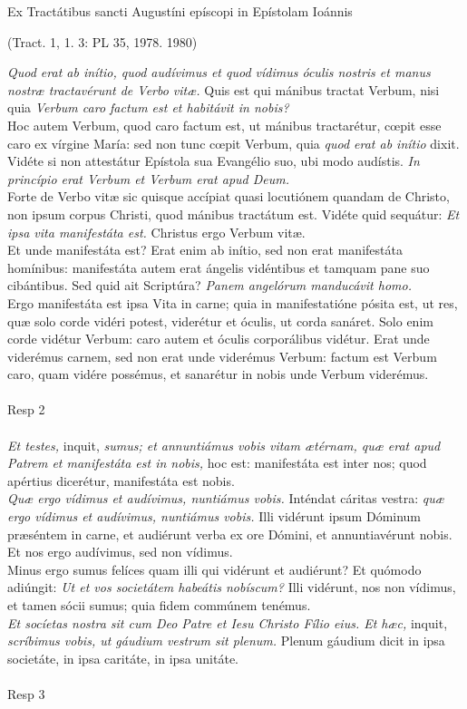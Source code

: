 \documentclass[options]{article}
\begin{document}
	Ex Tractátibus sancti Augustíni epíscopi in Epístolam Ioánnis 
	\begin{flushright}
	(Tract. 1, 1. 3: PL 35, 1978. 1980)
	\end{flushright}
	\emph{Quod erat ab inítio, quod audívimus et quod vídimus óculis nostris et manus nostræ tractavérunt de Verbo vitæ.} Quis est qui mánibus tractat Verbum, nisi quia \emph{Verbum caro factum est et habitávit in nobis?}\\
	Hoc autem Verbum, quod caro factum est, ut mánibus tractarétur, cœpit esse caro ex vírgine María: sed non tunc cœpit Verbum, quia \emph{quod erat ab inítio} dixit. Vidéte si non attestátur Epístola sua Evangélio suo, ubi modo audístis. \emph{In princípio erat Verbum et Verbum erat apud Deum.}\\
	Forte de Verbo vitæ sic quisque accípiat quasi locutiónem quandam de Christo, non ipsum corpus Christi, quod mánibus tractátum est. Vidéte quid sequátur: \emph{Et ipsa vita manifestáta est.} Christus ergo Verbum vitæ.\\
	Et unde manifestáta est? Erat enim ab inítio, sed non erat manifestáta homínibus: manifestáta autem erat ángelis vidéntibus et tamquam pane suo cibántibus. Sed quid ait Scriptúra? \emph{Panem angelórum manducávit homo.}\\
	Ergo manifestáta est ipsa Vita in carne; quia in manifestatióne pósita est, ut res, quæ solo corde vidéri potest, viderétur et óculis, ut corda sanáret. Solo enim corde vidétur Verbum: caro autem et óculis corporálibus vidétur. Erat unde viderémus carnem, sed non erat unde viderémus Verbum: factum est Verbum caro, quam vidére possémus, et sanarétur in nobis unde Verbum viderémus.\\
	\\
	Resp 2\\
	\\
	
	\emph{Et testes,} inquit, \emph{sumus; et annuntiámus vobis vitam ætérnam, quæ erat apud Patrem et manifestáta est in nobis,} hoc est: manifestáta est inter nos; quod apértius dicerétur, manifestáta est nobis.\\
	\emph{Quæ ergo vídimus et audívimus, nuntiámus vobis.}
	Inténdat cáritas vestra: \emph{quæ ergo vídimus et audívimus, nuntiámus vobis.} Illi vidérunt ipsum Dóminum præséntem in carne, et audiérunt verba ex ore Dómini, et annuntiavérunt nobis. Et nos ergo audívimus, sed non vídimus.\\
	Minus ergo sumus felíces quam illi qui vidérunt et audiérunt? Et quómodo adiúngit: \emph{Ut et vos societátem habeátis nobíscum?} Illi vidérunt, nos non vídimus, et tamen sócii sumus; quia fidem commúnem tenémus.\\
	\emph{Et socíetas nostra sit cum Deo Patre et Iesu Christo Fílio eius. Et hæc,} inquit, \emph{scríbimus vobis, ut gáudium vestrum sit plenum.} Plenum gáudium dicit in ipsa societáte, in ipsa caritáte, in ipsa unitáte.\\
	\\
	Resp 3
\end{document}
